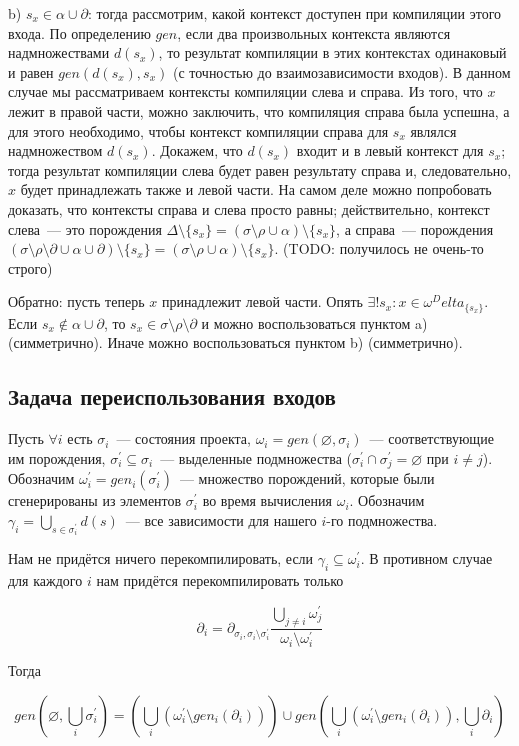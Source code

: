 b) $s_x \in \alpha \cup \partial$: тогда рассмотрим, какой контекст доступен при компиляции этого входа. По определению $gen$, если два произвольных контекста являются надмножествами $d(s_x)$, то результат компиляции в этих контекстах одинаковый и равен $gen(d(s_x), s_x)$ (с точностью до взаимозависимости входов). В данном случае мы рассматриваем контексты компиляции слева и справа. Из того, что $x$ лежит в правой части, можно заключить, что компиляция справа была успешна, а для этого необходимо, чтобы контекст компиляции справа для $s_x$ являлся надмножеством $d(s_x)$. Докажем, что $d(s_x)$ входит и в левый контекст для $s_x$; тогда результат компиляции слева будет равен результату справа и, следовательно, $x$ будет принадлежать также и левой части. На самом деле можно попробовать доказать, что контексты справа и слева просто равны; действительно, контекст слева~--- это порождения $\Delta\setminus\{s_x\} = (\sigma\setminus\rho\cup\alpha)\setminus\{s_x\}$, а справа~--- порождения $(\sigma\setminus\rho\setminus\partial\cup\alpha\cup\partial) \setminus \{s_x\} = (\sigma\setminus\rho\cup\alpha) \setminus \{s_x\}$. (TODO: получилось не очень-то строго)

Обратно: пусть теперь $x$ принадлежит левой части. Опять $\exists ! s_x : x \in \omega^Delta_{\{s_x\}}$. Если $s_x \notin \alpha\cup\partial$, то $s_x \in \sigma\setminus\rho\setminus\partial$ и можно воспользоваться пунктом a) (симметрично). Иначе можно воспользоваться пунктом b) (симметрично).

\subsection{Задача переиспользования входов}

Пусть $\forall i$ есть $\sigma_i$~--- состояния проекта, $\omega_i = gen(\varnothing, \sigma_i)$~--- соответствующие им порождения, $\sigma_i^\prime \subseteq \sigma_i$~--- выделенные подмножества ($\sigma_i^\prime \cap \sigma_j^\prime = \varnothing$ при $i \neq j$). Обозначим $\omega_i^\prime = gen_i(\sigma_i^\prime)$~--- множество порождений, которые были сгенерированы из элементов $\sigma_i^\prime$ во время вычисления $\omega_i$. Обозначим $\gamma_i = \bigcup\limits_{s \in \sigma_i^\prime} d(s)$~--- все зависимости для нашего $i$-го подмножества.

Нам не придётся ничего перекомпилировать, если $\gamma_i \subseteq \omega_i^\prime$. В противном случае для каждого $i$ нам придётся перекомпилировать только

$$\partial_i = \partial_{\sigma_i, \sigma_i\setminus\sigma_i^\prime} \dfrac{\bigcup\limits_{j \neq i} \omega_j^\prime}{\omega_i \setminus \omega_i^\prime}$$

Тогда

$$gen(\varnothing, \bigcup\limits_i \sigma_i^\prime) = \left( \bigcup\limits_i (\omega_i^\prime \setminus gen_i(\partial_i)) \right) \cup gen(\bigcup\limits_i (\omega_i^\prime \setminus gen_i(\partial_i)), \bigcup\limits_i \partial_i)$$

